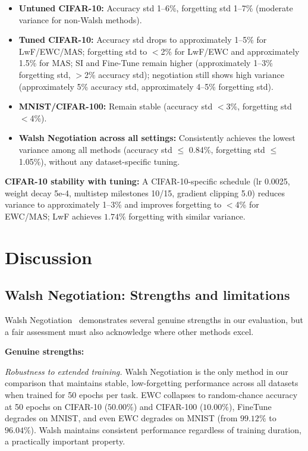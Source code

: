\documentclass[preprint,review,12pt]{elsarticle}
\begin{document}
\begin{itemize}
\item \textbf{Untuned CIFAR-10:} Accuracy std 1--6\%, forgetting std 1--7\% (moderate variance for non-Walsh methods).
\item \textbf{Tuned CIFAR-10:} Accuracy std drops to approximately 1--5\% for LwF/EWC/MAS; forgetting std to $<$2\% for LwF/EWC and approximately 1.5\% for MAS; SI and Fine-Tune remain higher (approximately 1--3\% forgetting std, $>$2\% accuracy std); negotiation still shows high variance (approximately 5\% accuracy std, approximately 4--5\% forgetting std).
\item \textbf{MNIST/CIFAR-100:} Remain stable (accuracy std $<$3\%, forgetting std $<$4\%).
\item \textbf{Walsh Negotiation across all settings:} Consistently achieves the lowest variance among all methods (accuracy std $\leq$ 0.84\%, forgetting std $\leq$ 1.05\%), without any dataset-specific tuning.
\end{itemize}

\textbf{CIFAR-10 stability with tuning:} A CIFAR-10-specific schedule (lr 0.0025, weight decay 5e-4, multistep milestones 10/15, gradient clipping 5.0) reduces variance to approximately 1--3\% and improves forgetting to $<$4\% for EWC/MAS; LwF achieves $1.74\%$ forgetting with similar variance.

\section{Discussion}

\subsection{Walsh Negotiation: Strengths and limitations}

Walsh Negotiation~\cite{korhan2023negotiated} demonstrates several genuine strengths in our evaluation, but a fair assessment must also acknowledge where other methods excel.

\textbf{Genuine strengths:}

\textit{Robustness to extended training.} Walsh Negotiation is the only method in our comparison that maintains stable, low-forgetting performance across all datasets when trained for 50 epochs per task. EWC collapses to random-chance accuracy at 50 epochs on CIFAR-10 ($50.00\%$) and CIFAR-100 ($10.00\%$), FineTune degrades on MNIST, and even EWC degrades on MNIST (from $99.12\%$ to $96.04\%$). Walsh maintains consistent performance regardless of training duration, a practically important property.
\end{document}
